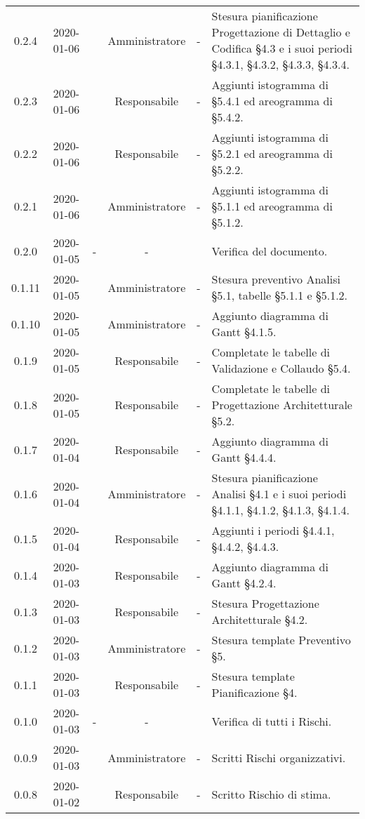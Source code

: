 {\begin{longtable}{ c c  C{2.5cm} c C{2.5cm} C{3.5cm}}
0.2.4 & 2020-01-06 & \LD{} & Amministratore & - & Stesura pianificazione Progettazione di Dettaglio e Codifica §4.3 e i suoi periodi §4.3.1, §4.3.2, §4.3.3, §4.3.4. \\
0.2.3 & 2020-01-06 & \SE{} & Responsabile & - & Aggiunti istogramma di §5.4.1 ed areogramma di §5.4.2. \\
0.2.2 & 2020-01-06 & \SE{} & Responsabile & - & Aggiunti istogramma di §5.2.1 ed areogramma di §5.2.2. \\
0.2.1 & 2020-01-06 & \LD{} & Amministratore & - & Aggiunti istogramma di §5.1.1 ed areogramma di §5.1.2. \\
0.2.0 & 2020-01-05 & - & - & \MC{} & Verifica del documento. \\
0.1.11 & 2020-01-05 & \LD{} & Amministratore & - & Stesura preventivo Analisi §5.1, tabelle §5.1.1 e §5.1.2. \\
0.1.10 & 2020-01-05 & \LD{} & Amministratore & - & Aggiunto diagramma di Gantt §4.1.5. \\
0.1.9 & 2020-01-05 & \SE{} & Responsabile & - & Completate le tabelle di Validazione e Collaudo §5.4.\\
0.1.8 & 2020-01-05 & \SE{} & Responsabile & - & Completate le tabelle di Progettazione Architetturale §5.2. \\
0.1.7 & 2020-01-04 & \SE{} & Responsabile & - & Aggiunto diagramma di Gantt §4.4.4. \\
0.1.6 & 2020-01-04 & \LD{} & Amministratore & - & Stesura pianificazione Analisi §4.1 e i suoi periodi §4.1.1, §4.1.2, §4.1.3, §4.1.4. \\
0.1.5 & 2020-01-04 & \SE{} & Responsabile & - & Aggiunti i periodi §4.4.1, §4.4.2, §4.4.3. \\
0.1.4 & 2020-01-03 & \SE{} & Responsabile & - & Aggiunto diagramma di Gantt §4.2.4. \\
0.1.3 & 2020-01-03 & \SE{} & Responsabile & - & Stesura Progettazione Architetturale §4.2.\\
0.1.2 & 2020-01-03 & \LD{} & Amministratore & - & Stesura template Preventivo §5. \\
0.1.1 & 2020-01-03 & \SE{} & Responsabile & - & Stesura template Pianificazione §4. \\
0.1.0 & 2020-01-03 & - & - & \AT{} & Verifica di tutti i Rischi. \\
0.0.9 & 2020-01-03 & \LD{} & Amministratore & - & Scritti Rischi organizzativi. \\
0.0.8 & 2020-01-02 & \SE{} & Responsabile & - & Scritto Rischio di stima. \\

\end{longtable}}
